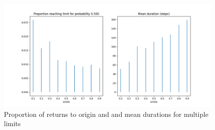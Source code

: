 \begin{figure}
\begin{center}
\includegraphics[width=\textwidth]{random-walk-02}
\caption{Proportion of returns to origin and and mean durations for multiple limits}\label{f.random-walk-2D}
\end{center}
\end{figure}
